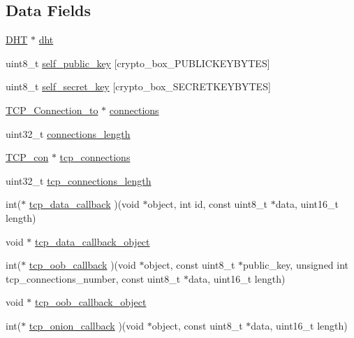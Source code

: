 \subsection*{Data Fields}
\begin{DoxyCompactItemize}
\item 
\hyperlink{struct_d_h_t}{D\+H\+T} $\ast$ \hyperlink{struct_t_c_p___connections_a8b3d6ce8745acc52695e252bdb1531b6}{dht}
\item 
uint8\+\_\+t \hyperlink{struct_t_c_p___connections_ae726df8bdc26380e5a6c3187a00d6881}{self\+\_\+public\+\_\+key} \mbox{[}crypto\+\_\+box\+\_\+\+P\+U\+B\+L\+I\+C\+K\+E\+Y\+B\+Y\+T\+E\+S\mbox{]}
\item 
uint8\+\_\+t \hyperlink{struct_t_c_p___connections_aa05050f86513ff53fe9da81f73c72267}{self\+\_\+secret\+\_\+key} \mbox{[}crypto\+\_\+box\+\_\+\+S\+E\+C\+R\+E\+T\+K\+E\+Y\+B\+Y\+T\+E\+S\mbox{]}
\item 
\hyperlink{struct_t_c_p___connection__to}{T\+C\+P\+\_\+\+Connection\+\_\+to} $\ast$ \hyperlink{struct_t_c_p___connections_a191cfbdd509a2705455744965ccfd724}{connections}
\item 
uint32\+\_\+t \hyperlink{struct_t_c_p___connections_a6c469b329395b7dfc09fc49900bf8f0d}{connections\+\_\+length}
\item 
\hyperlink{struct_t_c_p__con}{T\+C\+P\+\_\+con} $\ast$ \hyperlink{struct_t_c_p___connections_a600688b27d874e40eab4680fb90fa58a}{tcp\+\_\+connections}
\item 
uint32\+\_\+t \hyperlink{struct_t_c_p___connections_aa1780d3567bf0105a493ce227133f810}{tcp\+\_\+connections\+\_\+length}
\item 
int($\ast$ \hyperlink{struct_t_c_p___connections_a925f83cd475679a15e0510ad5b02a581}{tcp\+\_\+data\+\_\+callback} )(void $\ast$object, int id, const uint8\+\_\+t $\ast$data, uint16\+\_\+t length)
\item 
void $\ast$ \hyperlink{struct_t_c_p___connections_a7374235c800f886578e032a878618568}{tcp\+\_\+data\+\_\+callback\+\_\+object}
\item 
int($\ast$ \hyperlink{struct_t_c_p___connections_a758941f7bcf27ba64ae59503bef4ee06}{tcp\+\_\+oob\+\_\+callback} )(void $\ast$object, const uint8\+\_\+t $\ast$public\+\_\+key, unsigned int tcp\+\_\+connections\+\_\+number, const uint8\+\_\+t $\ast$data, uint16\+\_\+t length)
\item 
void $\ast$ \hyperlink{struct_t_c_p___connections_aa008021141b9c1d9861a06d12b495f55}{tcp\+\_\+oob\+\_\+callback\+\_\+object}
\item 
int($\ast$ \hyperlink{struct_t_c_p___connections_ad92f3faa26e9b50df859c26416692b01}{tcp\+\_\+onion\+\_\+callback} )(void $\ast$object, const uint8\+\_\+t $\ast$data, uint16\+\_\+t length)

\end{DoxyCompactItemize}

